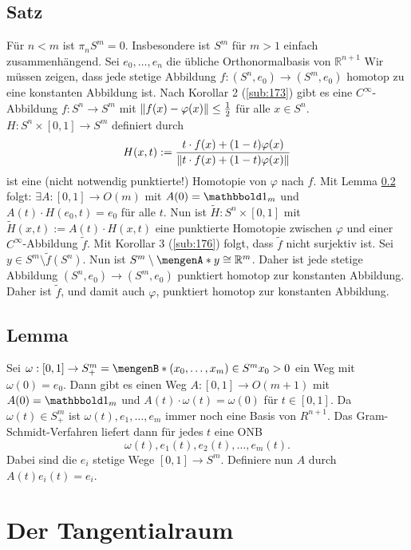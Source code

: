 \subsection{Satz} %
\label{sub:177}
Für $n < m$ ist $\pi_n S^m = 0$. Insbesondere ist $S^m$ für $m>1$ einfach zusammenhängend.
Sei $e_0, \ldots , e_n$ die übliche Orthonormalbasis von $\mathds{R}^{n+1}$
Wir müssen zeigen, dass jede stetige Abbildung $f : (S^n, e_0) \to (S^m, e_0)$ homotop zu eine konstanten Abbildung ist. Nach Korollar 2 (\ref{sub:173}) gibt es eine 
$C^\infty$-Abbildung $f : S^n \to S^m$ mit $\norm{f(x)- \varphi(x)} \le \frac{1}{2}$ für alle $x \in S^n$. $H : S^n \times [0,1] \to S^m$ definiert durch
\[
	H(x,t) := \frac{t \cdot f(x)+ (1-t)\varphi(x)}{\norm{t \cdot f(x) + (1-t) \varphi(x)}} 
\]
ist eine (nicht notwendig punktierte!) Homotopie von $\varphi$ nach $f$. Mit Lemma \ref{sub:178} folgt: $\exists A : [0,1] \to O(m)$ mit $A(0)= \ind_m$ und
$A(t) \cdot H(e_0,t) = e_0$ für alle $t$. Nun ist $\tilde{H} : S^n \times [0,1]$ mit $\tilde{H}(x,t) := A(t) \cdot H(x,t)$ eine punktierte Homotopie zwischen $\varphi$ und
einer $C^\infty$-Abbildung $\tilde{f}$. Mit Korollar 3 (\ref{sub:176}) folgt, dass $\tilde{f}$ nicht surjektiv ist. Sei $y \in S^m \setminus \tilde{f}(S^n)$. Nun ist
$S^m \setminus \set{y} \cong \mathds{R}^m$. Daher ist jede stetige Abbildung $(S^n, e_0) \to (S^m,e_0)$ punktiert homotop zur konstanten Abbildung. Daher ist $\tilde{f}$,
und damit auch $\varphi$, punktiert homotop zur konstanten Abbildung. \bewende

\subsection{Lemma} %
\label{sub:178}
Sei $\omega : [0,1] \to S^m_+ = \set[(x_0, \ldots , x_m) \in S^m]{x_0 >0}$ ein Weg mit $\omega(0)=e_0$. Dann gibt es einen Weg $A : [0,1] \to O(m+1)$ mit $A(0)=\ind_m$
und $A(t) \cdot \omega(t) = \omega(0)$ für $t \in [0,1]$.
Da $\omega(t) \in S^m_+$ ist $\omega(t), e_1, \ldots ,e_m$ immer noch eine Basis von $R^{n+1}$. Das Gram-Schmidt-Verfahren liefert dann für jedes $t$ eine ONB 
\[
	\omega(t), e_1(t), e_2(t), \ldots , e_m(t).
\]
Dabei sind die $e_i$ stetige Wege $[0,1] \to S^m$. Definiere nun $A$ durch $A(t)e_i(t) = e_i$. \bewende
\newpage

\section{Der Tangentialraum} %
\label{sec:18}

